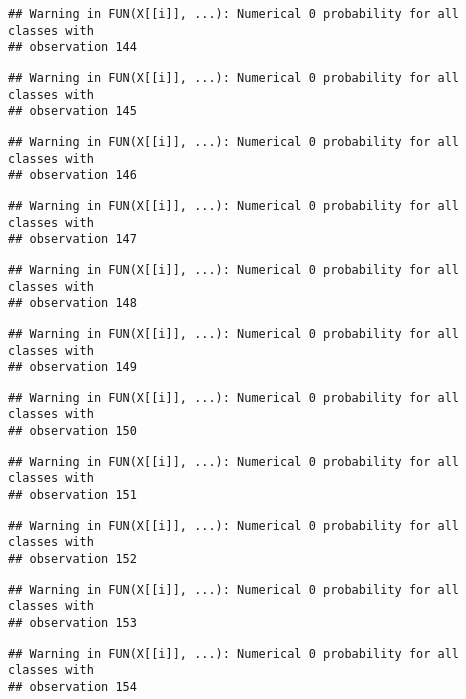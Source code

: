 \documentclass[
]{article}
\begin{document}
\begin{verbatim}
## Warning in FUN(X[[i]], ...): Numerical 0 probability for all classes with
## observation 144
\end{verbatim}

\begin{verbatim}
## Warning in FUN(X[[i]], ...): Numerical 0 probability for all classes with
## observation 145
\end{verbatim}

\begin{verbatim}
## Warning in FUN(X[[i]], ...): Numerical 0 probability for all classes with
## observation 146
\end{verbatim}

\begin{verbatim}
## Warning in FUN(X[[i]], ...): Numerical 0 probability for all classes with
## observation 147
\end{verbatim}

\begin{verbatim}
## Warning in FUN(X[[i]], ...): Numerical 0 probability for all classes with
## observation 148
\end{verbatim}

\begin{verbatim}
## Warning in FUN(X[[i]], ...): Numerical 0 probability for all classes with
## observation 149
\end{verbatim}

\begin{verbatim}
## Warning in FUN(X[[i]], ...): Numerical 0 probability for all classes with
## observation 150
\end{verbatim}

\begin{verbatim}
## Warning in FUN(X[[i]], ...): Numerical 0 probability for all classes with
## observation 151
\end{verbatim}

\begin{verbatim}
## Warning in FUN(X[[i]], ...): Numerical 0 probability for all classes with
## observation 152
\end{verbatim}

\begin{verbatim}
## Warning in FUN(X[[i]], ...): Numerical 0 probability for all classes with
## observation 153
\end{verbatim}

\begin{verbatim}
## Warning in FUN(X[[i]], ...): Numerical 0 probability for all classes with
## observation 154
\end{verbatim}
\end{document}
